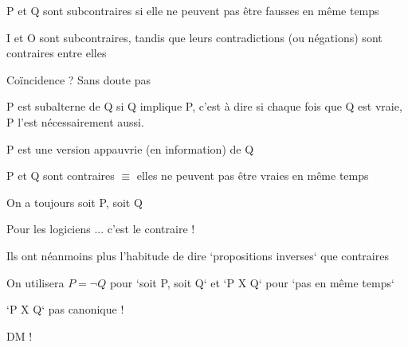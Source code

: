 \begin{frame}

			\begin{description}[labelindent=6pt,style=multiline,leftmargin=1.3in]
		 \setlength\itemsep{1em}
\item[Subcontraire] P et Q sont subcontraires si elle ne peuvent pas être fausses en même temps\pause
\item[Remarque] I et O sont subcontraires, tandis que leurs contradictions (ou négations) sont contraires entre elles\pause
\item[] Coïncidence ? \pause Sans doute pas\pause
\item[Subalterne] P est subalterne de Q si Q implique P\pause, c'est à dire si chaque fois que Q est vraie, P l'est nécessairement aussi.
	 \pause
\item[def alternative] P est une version appauvrie (en information) de Q
	\end{description}
\end{frame}


\begin{frame}
			\begin{description}[labelindent=6pt,style=multiline,leftmargin=1.3in]
		 \setlength\itemsep{1em}
\item[Contraires] P et Q sont contraires $\equiv$ elles ne peuvent pas être vraies en même temps 
\item[Contradiction] On a toujours soit P, soit Q\pause
\item[Cependant] Pour les logiciens ... \pause c'est le contraire !\pause
\item[] Ils ont néanmoins plus l'habitude de dire `propositions inverses` que contraires \pause
\item[] On utilisera $P = \neg Q$ pour `soit P, soit Q` et `P X Q` pour `pas en même temps`
\item[Attention] `P X Q` pas canonique !
	\end{description}
\end{frame}



\begin{frame}
	
	DM !
\end{frame}

